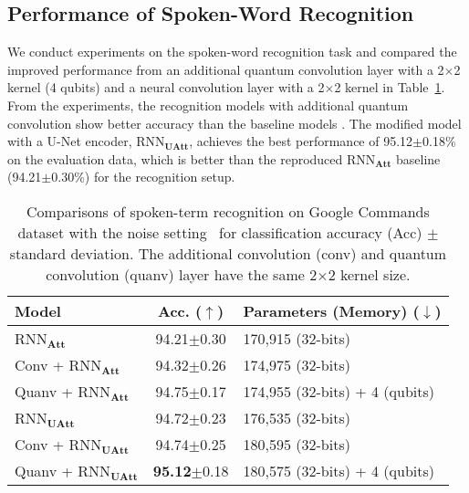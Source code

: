 \documentclass{article}
\begin{document}
\subsection{Performance of Spoken-Word Recognition}
We conduct experiments on the spoken-word recognition task and compared the improved performance from an additional quantum convolution layer with a 2$\times$2 kernel (4 qubits) and a neural convolution layer with a 2$\times$2 kernel in Table~\ref{tab:1:acc}. From the experiments, the recognition models with additional quantum convolution show better accuracy than the baseline models \cite{de2018neural}. The modified model with a U-Net encoder, RNN$_\mathbf{UAtt}$, achieves the best performance 
of 95.12$\pm$0.18\% on the evaluation data, which is better than 
the reproduced RNN$_\mathbf{Att}$ baseline (94.21$\pm$0.30\%) for the recognition setup. 



\begin{table}[ht!]
\centering
\caption{Comparisons of spoken-term recognition on Google Commands dataset with the noise setting~\cite{warden2018speech} for classification accuracy (Acc) $\pm$ standard deviation. The additional convolution (conv) and quantum convolution (quanv) layer have the same 2$\times$2 kernel size.}
\label{tab:1:acc}
\begin{adjustbox}{width=0.48\textwidth}
\begin{tabular}{|l|c|l|}
\hline
Model & Acc. ($\uparrow$) & Parameters (Memory) ($\downarrow$) \\ \hline
RNN$_\mathbf{Att}$~\cite{de2018neural} & 94.21$\pm$0.30 & 170,915 (32-bits) \\
Conv + RNN$_\mathbf{Att}$& 94.32$\pm$0.26 & 174,975 (32-bits) \\
Quanv + RNN$_\mathbf{Att}$ & 94.75$\pm$0.17 & 174,955 (32-bits) + 4 (qubits) \\ \hline
RNN$_\mathbf{UAtt}$ & 94.72$\pm$0.23 & 176,535 (32-bits) \\
Conv + RNN$_\mathbf{UAtt}$ & 94.74$\pm$0.25 & 180,595 (32-bits) \\
Quanv + RNN$_\mathbf{UAtt}$ & \textbf{95.12}$\pm$0.18 & 180,575 (32-bits) + 4 (qubits) \\ \hline
\end{tabular}
\end{adjustbox}
\vspace{-4mm}
\end{table}
\end{document}
